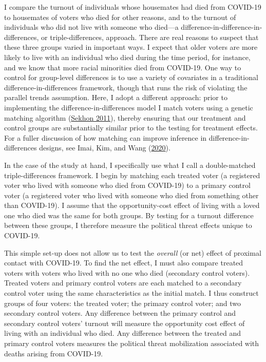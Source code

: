 \documentclass[
  12pt,
]{article}
\begin{document}
I compare the turnout of individuals whose housemates had died from COVID-19 to housemates of voters who died for other reasons, and to the turnout of individuals who did not live with someone who died---a difference-in-difference-in-differences, or triple-differences, approach. There are real reasons to suspect that these three groups varied in important ways. I expect that older voters are more likely to live with an individual who died during the time period, for instance, and we know that more racial minorities died from COVID-19. One way to control for group-level differences is to use a variety of covariates in a traditional difference-in-differences framework, though that runs the risk of violating the parallel trends assumption. Here, I adopt a different approach: prior to implementing the difference-in-differences model I match voters using a genetic matching algorithm (\protect\hyperlink{ref-Sekhon2011}{Sekhon 2011}), thereby ensuring that our treatment and control groups are substantially similar prior to the testing for treatment effects. For a fuller discussion of how matching can improve inference in difference-in-differences designs, see Imai, Kim, and Wang (\protect\hyperlink{ref-Imai2020}{2020}).

In the case of the study at hand, I specifically use what I call a double-matched triple-differences framework. I begin by matching each treated voter (a registered voter who lived with someone who died from COVID-19) to a primary control voter (a registered voter who lived with someone who died from something other than COVID-19). I assume that the opportunity-cost effect of living with a loved one who died was the same for both groups. By testing for a turnout difference between these groups, I therefore measure the political threat effects unique to COVID-19.

This simple set-up does not allow us to test the \emph{overall} (or net) effect of proximal contact with COVID-19. To find the net effect, I must also compare treated voters with voters who lived with no one who died (secondary control voters). Treated voters and primary control voters are each matched to a secondary control voter using the same characteristics as the initial match. I thus construct groups of four voters: the treated voter; the primary control voter; and two secondary control voters. Any difference between the primary control and secondary control voters' turnout will measure the opportunity cost effect of living with an individual who died. Any difference between the treated and primary control voters measures the political threat mobilization associated with deaths arising from COVID-19.
\end{document}
